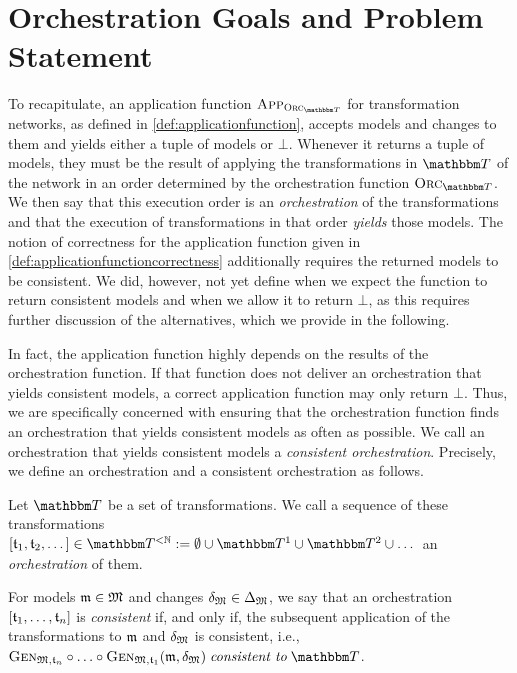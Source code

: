 \section{Orchestration Goals and Problem Statement} %

To recapitulate, an application function $\appfunction{\orcfunction{\transformationset{T}}}$ for transformation networks, as defined in \autoref{def:applicationfunction}, accepts models and changes to them and yields either a tuple of models or $\bot$.
Whenever it returns a tuple of models, they must be the result of applying the transformations in $\transformationset{T}$ of the network in an order determined by the orchestration function $\orcfunction{\transformationset{T}}$.
We then say that this execution order is an \emph{orchestration} of the transformations and that the execution of transformations in that order \emph{yields} those models.
The notion of correctness for the application function given in \autoref{def:applicationfunctioncorrectness} additionally requires the returned models to be consistent.
We did, however, not yet define when we expect the function to return consistent models and when we allow it to return $\bot$, as this requires further discussion of the alternatives, which we provide in the following.

In fact, the application function highly depends on the results of the orchestration function.
If that function does not deliver an orchestration that yields consistent models, a correct application function may only return $\bot$.
Thus, we are specifically concerned with ensuring that the orchestration function finds an orchestration that yields consistent models as often as possible.
We call an orchestration that yields consistent models a \emph{consistent orchestration}.
Precisely, we define an orchestration and a consistent orchestration as follows.

\begin{definition}[Orchestration]
    Let $\transformationset{T}$ be a set of transformations.
    We call a sequence of these transformations $\sequenced{\transformation{t}_{1}, \transformation{t}_{2}, \dots} \in \transformationset{T}^{< \mathbb{N}} \equalsperdefinition \emptyset \cup \transformationset{T}^1 \cup \transformationset{T}^2 \cup \dots$ an \emph{orchestration} of them.

    For models $\mathfrak{m} \in \mathfrak{M}$ and changes $\mathfrak{\delta}_{\mathfrak{M}} \in \Delta_{\mathfrak{M}}$, we say that an orchestration $[\mathfrak{t}_{1}, \dots, \mathfrak{t}_{n}]$ is \emph{consistent} if, and only if, the subsequent application of the transformations to $\mathfrak{m}$ and $\mathfrak{\delta}_{\mathfrak{M}}$  is consistent, i.e., $\generalizationfunction{\metamodeltuple{M},\transformation{t}_{n}} \concatfunction \dots \concatfunction \generalizationfunction{\metamodeltuple{M},\transformation{t}_{1}}(\modeltuple{m}, \changetuple{\metamodeltuple{M}}) \consistenttomath \transformationset{T}$.
\end{definition}


